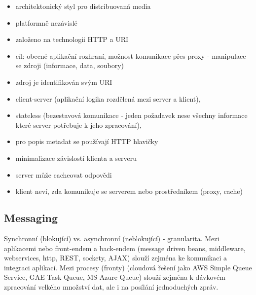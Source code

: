\begin{itemize}[itemsep=0px]
\item architektonický styl pro distribuovaná media
\item platformně nezávislé
\item založeno na technologii HTTP a URI
\item cíl: obecné aplikační rozhraní, možnost komunikace přes proxy - manipulace se zdroji (informace, data, soubory)
\item zdroj je identifikován svým URI
\item client-server (aplikační logika rozdělená mezi server a klient),
\item stateless (bezestavová komunikace - jeden požadavek nese všechny informace které server potřebuje k jeho zpracování),
\item pro popis metadat se používají HTTP hlavičky
\item minimalizace závislostí klienta a serveru
\item server může cacheovat odpovědi
\item klient neví, zda komunikuje se serverem nebo prostředníkem (proxy, cache)
\end{itemize}

\subsection{Messaging}
Synchronní (blokující) vs. asynchronní (neblokující) - granularita. Mezi aplikacemi nebo front-endem a back-endem (message driven beans, middleware, webservices, http, REST, sockety, AJAX) slouží zejména ke komunikaci a integraci aplikací. Mezi procesy (fronty) (cloudová řešení jako AWS Simple Queue Service, GAE Task Queue, MS Azure Queue) slouží zejména k dávkovém zpracování velkého množství dat, ale i na posílání jednoduchých zpráv.
